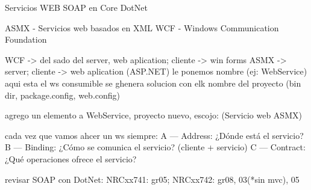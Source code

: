 Servicios WEB SOAP en Core DotNet

ASMX - Servicios web basados en XML
WCF - Windows Communication Foundation

WCF ->  del sado del server, web aplication; cliente -> win forms
ASMX -> server; cliente -> web aplication
(ASP.NET) le ponemos nombre (ej: WebService) aqui esta el ws consumible
se ghenera solucion con elk nombre del proyecto
(bin dir, package.config, web.config)

agrego un elemento a WebService, proyecto nuevo, escojo: (Servicio web ASMX)



cada vez que vamos  ahcer un ws siempre:
A — Address: ¿Dónde está el servicio?
B — Binding: ¿Cómo se comunica el servicio? (cliente + servicio)
C — Contract: ¿Qué operaciones ofrece el servicio?

revisar
SOAP con DotNet:
NRCxx741: gr05; NRCxx742: gr08, 03(*sin mvc), 05